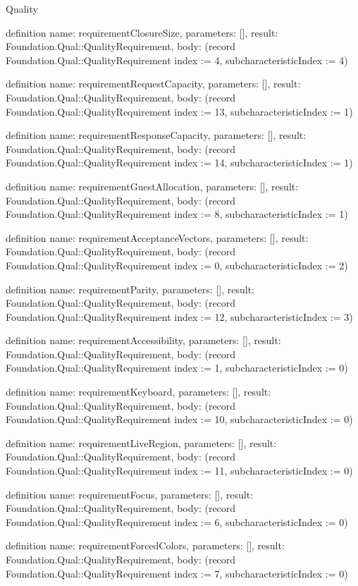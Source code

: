 \begin{lexlean}{Quality}
\begin{semanticmodule}
definition{
  name: requirementClosureSize,
  parameters: [],
  result: Foundation.Qual::QualityRequirement,
  body: (record Foundation.Qual::QualityRequirement {index := 4, subcharacteristicIndex := 4})
}

definition{
  name: requirementRequestCapacity,
  parameters: [],
  result: Foundation.Qual::QualityRequirement,
  body: (record Foundation.Qual::QualityRequirement {index := 13, subcharacteristicIndex := 1})
}

definition{
  name: requirementResponseCapacity,
  parameters: [],
  result: Foundation.Qual::QualityRequirement,
  body: (record Foundation.Qual::QualityRequirement {index := 14, subcharacteristicIndex := 1})
}

definition{
  name: requirementGuestAllocation,
  parameters: [],
  result: Foundation.Qual::QualityRequirement,
  body: (record Foundation.Qual::QualityRequirement {index := 8, subcharacteristicIndex := 1})
}

definition{
  name: requirementAcceptanceVectors,
  parameters: [],
  result: Foundation.Qual::QualityRequirement,
  body: (record Foundation.Qual::QualityRequirement {index := 0, subcharacteristicIndex := 2})
}

definition{
  name: requirementParity,
  parameters: [],
  result: Foundation.Qual::QualityRequirement,
  body: (record Foundation.Qual::QualityRequirement {index := 12, subcharacteristicIndex := 3})
}

definition{
  name: requirementAccessibility,
  parameters: [],
  result: Foundation.Qual::QualityRequirement,
  body: (record Foundation.Qual::QualityRequirement {index := 1, subcharacteristicIndex := 0})
}

definition{
  name: requirementKeyboard,
  parameters: [],
  result: Foundation.Qual::QualityRequirement,
  body: (record Foundation.Qual::QualityRequirement {index := 10, subcharacteristicIndex := 0})
}

definition{
  name: requirementLiveRegion,
  parameters: [],
  result: Foundation.Qual::QualityRequirement,
  body: (record Foundation.Qual::QualityRequirement {index := 11, subcharacteristicIndex := 0})
}

definition{
  name: requirementFocus,
  parameters: [],
  result: Foundation.Qual::QualityRequirement,
  body: (record Foundation.Qual::QualityRequirement {index := 6, subcharacteristicIndex := 0})
}

definition{
  name: requirementForcedColors,
  parameters: [],
  result: Foundation.Qual::QualityRequirement,
  body: (record Foundation.Qual::QualityRequirement {index := 7, subcharacteristicIndex := 0})
}


\end{semanticmodule}
\end{lexlean}
